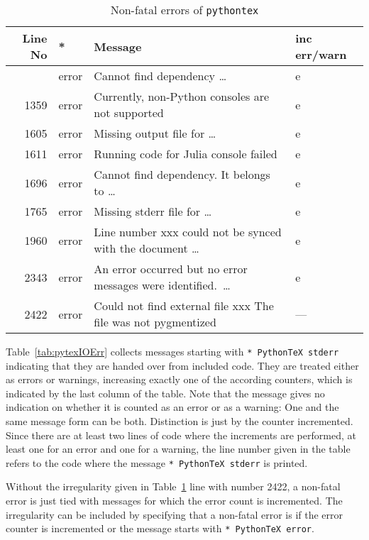 \documentclass[a4paper]{article}%
\begin{document}
{\small
\begin{longtable}{|rlll|}
  \toprule
  Line No       & * & Message & inc err/warn  \\
  \midrule
  \midrule
  \endfirsthead%
  \bottomrule
  \caption{\label{tab:pytexNFErr} Non-fatal errors of \texttt{pythontex}  }
  \endlastfoot%
   655 & error  & Cannot find dependency \dots                                   & e   \\%
  1359 & error  & Currently, non-Python consoles are not supported               & e   \\%
  1605 & error  & Missing output file for \dots                                  & e   \\%
  1611 & error  & Running code for Julia console failed                          & e   \\%
  1696 & error  & Cannot find dependency. It belongs to \dots                    & e   \\%
  1765 & error  & Missing stderr file for \dots                                  & e   \\%
  1960 & error  & Line number xxx could not be synced with the document \dots    & e   \\%
  2343 & error  & An error occurred but no error messages were identified.~\dots & e   \\
  2422 & error  & Could not find external file xxx The file was not pygmentized  & --- \\ %
\end{longtable}
} %

Table~\ref{tab:pytexIOErr} collects messages starting with \texttt{* PythonTeX stderr} 
indicating that they are handed over from included code.  
They are treated either as errors or warnings, 
increasing exactly one of the according counters, 
which is indicated by the last column of the table. 
Note that the message gives no indication on whether it is counted as an error or as a warning: 
One and the same message form can be both. 
Distinction is just by the counter incremented. 
Since there are at least two lines of code where the increments are performed, 
at least one for an error and one for a warning, 
the line number given in the table refers to the code where the message 
\texttt{* PythonTeX stderr} is printed. 

Without the irregularity given in Table~\ref{tab:pytexNFErr} line with number 2422, 
a non-fatal error is just tied with messages for which the error count is incremented. 
The irregularity can be included by specifying 
that a non-fatal error is if the error counter is incremented 
or the message starts with \texttt{* PythonTeX error}. 
\end{document}
